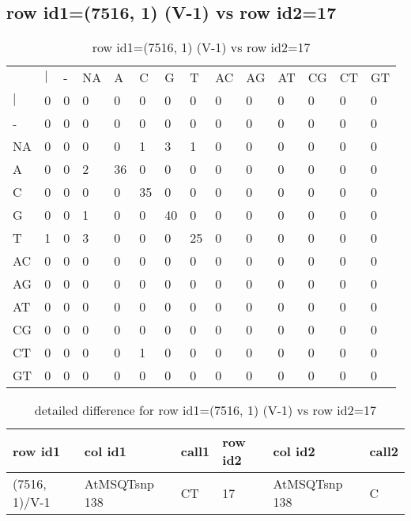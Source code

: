 \subsection{row id1=(7516, 1) (V-1) vs row id2=17}
\begin{center}
\begin{longtable}{|l|l|l|l|l|l|l|l|l|l|l|l|l|l|}
\caption{row id1=(7516, 1) (V-1) vs row id2=17} \label{table_dm322}\\
\hline
\\
\hline
&$|$&-&NA&A&C&G&T&AC&AG&AT&CG&CT&GT\\
$|$&0&0&0&0&0&0&0&0&0&0&0&0&0\\
-&0&0&0&0&0&0&0&0&0&0&0&0&0\\
NA&0&0&0&0&1&3&1&0&0&0&0&0&0\\
A&0&0&2&36&0&0&0&0&0&0&0&0&0\\
C&0&0&0&0&35&0&0&0&0&0&0&0&0\\
G&0&0&1&0&0&40&0&0&0&0&0&0&0\\
T&1&0&3&0&0&0&25&0&0&0&0&0&0\\
AC&0&0&0&0&0&0&0&0&0&0&0&0&0\\
AG&0&0&0&0&0&0&0&0&0&0&0&0&0\\
AT&0&0&0&0&0&0&0&0&0&0&0&0&0\\
CG&0&0&0&0&0&0&0&0&0&0&0&0&0\\
CT&0&0&0&0&1&0&0&0&0&0&0&0&0\\
GT&0&0&0&0&0&0&0&0&0&0&0&0&0\\
\hline
\end{longtable}
\end{center}

\begin{center}
\begin{longtable}{|l|l|l|l|l|l|}
\caption{detailed difference for row id1=(7516, 1) (V-1) vs row id2=17} \label{table_dm323}\\
\hline
row id1&col id1&call1&row id2&col id2&call2\\
\hline
(7516, 1)/V-1&AtMSQTsnp 138&CT&17&AtMSQTsnp 138&C\\
\hline
\end{longtable}
\end{center}


